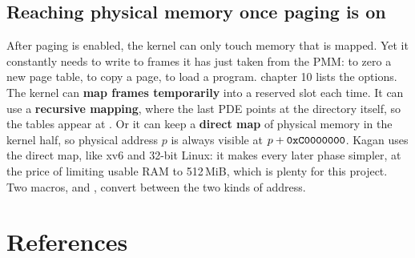 \documentclass[11pt,a4paper]{article}
\begin{document}
\subsection{Reaching physical memory once paging is on}

After paging is enabled, the kernel can only touch memory that is mapped. Yet it constantly needs to write to frames
it has just taken from the PMM: to zero a new page table, to copy a page, to load a program. \LOB chapter 10 lists the
options. The kernel can \textbf{map frames temporarily} into a reserved slot each time. It can use a \textbf{recursive
mapping}, where the last PDE points at the directory itself, so the tables appear at . Or it can
keep a \textbf{direct map} of physical memory in the kernel half, so physical address $p$ is always visible at
$p + \code{0xC0000000}$. Kagan uses the direct map, like xv6 and 32-bit Linux: it makes every later phase simpler,
at the price of limiting usable RAM to 512\,MiB, which is plenty for this project. Two macros,  and
, convert between the two kinds of address.

\section{References}
\end{document}

